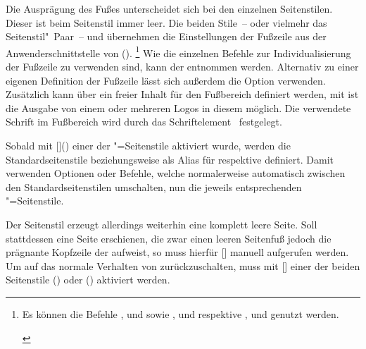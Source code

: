 \begin{DeclareEntity*}{}
\begin{DeclareEntity*}{}
\begin{DeclareEntity*}{}
\begin{Declaration}
\begin{Declaration}
\begin{Declaration}
Die Ausprägung des Fußes unterscheidet sich bei den einzelnen Seitenstilen. 
Dieser ist beim Seitenstil  immer leer. Die beiden 
Stile~-- oder vielmehr das Seitenstil"~Paar~--  und 
 übernehmen die Einstellungen der Fußzeile aus der 
Anwenderschnittstelle von ().%
\footnote{%
  \begin{Entity}{}
  Es können die Befehle
  ,  und  sowie , 
   und  respektive ,  und 
   genutzt werden.%
  \end{Entity}
}
Wie die einzelnen Befehle zur Individualisierung der Fußzeile zu verwenden 
sind, kann der  entnommen werden. Alternativ 
zu einer eigenen Definition der Fußzeile lässt sich außerdem die Option 
 verwenden. Zusätzlich kann über  ein freier 
Inhalt für den Fußbereich definiert werden, mit  ist die 
Ausgabe von einem oder mehreren Logos in diesem möglich. Die verwendete Schrift 
im Fußbereich wird durch das Schriftelement~ festgelegt.

Sobald mit []() 
einer der "=Seitenstile aktiviert wurde, werden die 
Standardseitenstile  beziehungsweise  als 
Alias für  respektive  
definiert. Damit verwenden Optionen oder Befehle, welche normalerweise 
automatisch zwischen den Standardseitenstilen umschalten, nun die jeweils 
entsprechenden "=Seitenstile.

Der Seitenstil  erzeugt allerdings weiterhin eine komplett 
leere Seite. Soll stattdessen eine Seite erschienen, die zwar einen leeren 
Seitenfuß jedoch die prägnante Kopfzeile der \TnUD aufweist, so muss hierfür 
[] manuell aufgerufen werden. 
Um auf das normale Verhalten von \KOMAScript{} zurückzuschalten, muss mit 
[] einer der beiden Seitenstile 
() oder 
() aktiviert werden.%
\end{Declaration}
\end{Declaration}
\end{Declaration}
%


\end{DeclareEntity*}
\end{DeclareEntity*}
\end{DeclareEntity*}
